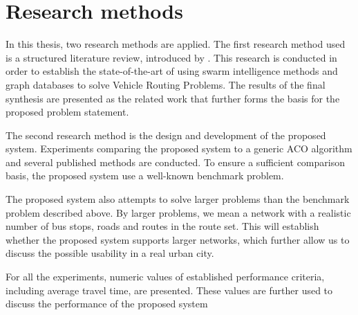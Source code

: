 \section{Research methods}


In this thesis, two research methods are applied. The first research method used is a structured literature review, introduced by \citep{kofod2014}. This research is conducted in order to establish the state-of-the-art of using swarm intelligence methods and graph databases to solve Vehicle Routing Problems. The results of the final synthesis are presented as the related work that further forms the basis for the proposed problem statement. 

The second research method is the design and development of the proposed system. Experiments comparing the proposed system to a generic ACO algorithm and several published methods are conducted. To ensure a sufficient comparison basis, the proposed system use a well-known benchmark problem.  

The proposed system also attempts to solve larger problems than the benchmark problem described above. By larger problems, we mean a network with a realistic number of bus stops, roads and routes in the route set. This will establish whether the proposed system supports larger networks, which further allow us to discuss the possible usability in a real urban city. 

For all the experiments, numeric values of established performance criteria, including average travel time, are presented. These values are further used to discuss the performance of the proposed system




